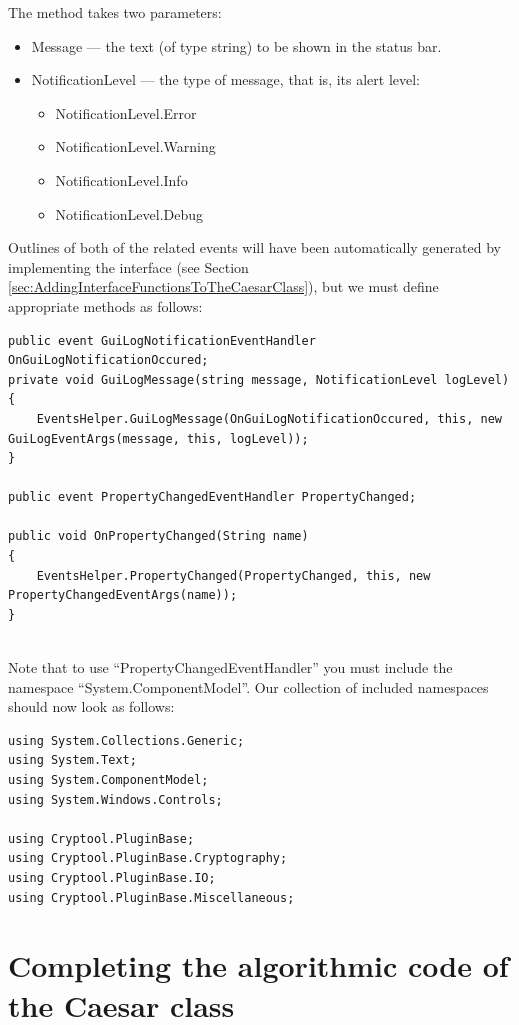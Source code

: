 The method takes two parameters:

\begin{itemize}
	\item Message --- the text (of type string) to be shown in the status bar.
	\item NotificationLevel --- the type of message, that is, its alert level:
	\begin{itemize}
		\item NotificationLevel.Error
		\item NotificationLevel.Warning
		\item NotificationLevel.Info
		\item NotificationLevel.Debug
	\end{itemize}
\end{itemize}

Outlines of both of the related events will have been automatically generated by implementing the interface (see Section \ref{sec:AddingInterfaceFunctionsToTheCaesarClass}), but we must define appropriate methods as follows:

\begin{lstlisting}
public event GuiLogNotificationEventHandler OnGuiLogNotificationOccured;
private void GuiLogMessage(string message, NotificationLevel logLevel)
{
	EventsHelper.GuiLogMessage(OnGuiLogNotificationOccured, this, new GuiLogEventArgs(message, this, logLevel));
}

public event PropertyChangedEventHandler PropertyChanged;

public void OnPropertyChanged(String name)
{
	EventsHelper.PropertyChanged(PropertyChanged, this, new PropertyChangedEventArgs(name));
}
\end{lstlisting}

\ \\
\indent Note that to use ``PropertyChangedEventHandler'' you must include the namespace ``System.\linebreak ComponentModel''. Our collection of included namespaces should now look as follows:

\begin{lstlisting}
using System.Collections.Generic;
using System.Text;
using System.ComponentModel;
using System.Windows.Controls;

using Cryptool.PluginBase;
using Cryptool.PluginBase.Cryptography;
using Cryptool.PluginBase.IO;
using Cryptool.PluginBase.Miscellaneous;
\end{lstlisting}
\clearpage

\section{Completing the algorithmic code of the Caesar class}
\label{sec:CompletingTheAlgorithmicCodeOfTheCaesarClass}

